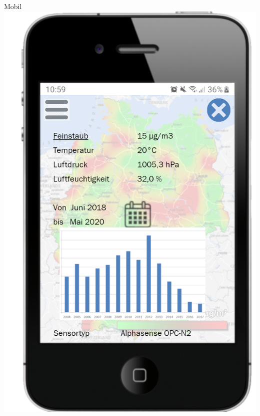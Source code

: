 \begin{frame}{Mobil}
    \centering
    \includegraphics[height=0.8\textheight]{../../media/AktuelleDaten-Mobile-Version}
\end{frame}


